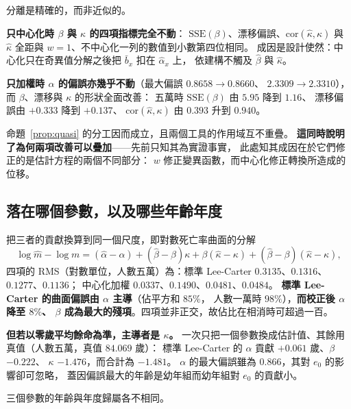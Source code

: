 \documentclass[UTF8, fontset=macnew, a4paper, 12pt]{ctexart}
\begin{document}
分離是精確的，而非近似的。

\textbf{只中心化時 $\beta$ 與 $\kappa$ 的四項指標完全不動}：
$\mathrm{SSE}(\beta)$、漂移偏誤、$\mathrm{cor}(\hat\kappa,\kappa)$ 與
$\hat\kappa$ 全距與 $w=1$、不中心化一列的數值到小數第四位相同。
成因是設計使然：中心化只在奇異值分解之後把 $\bar b_x$ 扣在 $\hat\alpha_x$ 上，
依建構不觸及 $\hat\beta$ 與 $\hat\kappa$。

\textbf{只加權時 $\alpha$ 的偏誤亦幾乎不動}（最大偏誤 $0.8658\to0.8660$、
$2.3309\to2.3310$），而 $\beta$、漂移與 $\kappa$ 的形狀全面改善：
五萬時 $\mathrm{SSE}(\beta)$ 由 $5.95$ 降到 $1.16$、
漂移偏誤由 $+0.333$ 降到 $+0.137$、
$\mathrm{cor}(\hat\kappa,\kappa)$ 由 $0.393$ 升到 $0.940$。

命題~\ref{prop:quasi} 的分工因而成立，且兩個工具的作用域互不重疊。
\textbf{這同時說明了為何兩項改善可以疊加}——先前只知其為實證事實，
此處知其成因在於它們修正的是估計方程的兩個不同部分：
$w$ 修正變異函數，而中心化修正轉換所造成的位移。

\subsection{落在哪個參數，以及哪些年齡年度}\label{subsec:where}

把三者的貢獻換算到同一個尺度，即對數死亡率曲面的分解
$$\log\hat m-\log m=(\hat\alpha-\alpha)+(\hat\beta-\beta)\kappa
+\beta(\hat\kappa-\kappa)+(\hat\beta-\beta)(\hat\kappa-\kappa),$$
四項的 RMS（對數單位，人數五萬）為：標準 Lee-Carter
$0.3135$、$0.1316$、$0.1277$、$0.1136$；
中心化加權 $0.0337$、$0.1490$、$0.0481$、$0.0484$。
\textbf{標準 Lee-Carter 的曲面偏誤由 $\alpha$ 主導}（佔平方和 $85\%$，
人數一萬時 $98\%$），\textbf{而校正後 $\alpha$ 降至 $8\%$、
$\beta$ 成為最大的殘項}。四項並非正交，故佔比在相消時可超過一百。

\textbf{但若以零歲平均餘命為準，主導者是 $\kappa$。}
一次只把一個參數換成估計值、其餘用真值（人數五萬，真值 $84.069$ 歲）：
標準 Lee-Carter 的 $\alpha$ 貢獻 $+0.061$ 歲、$\beta$ $-0.222$、
$\kappa$ $\mathbf{-1.476}$，而合計為 $-1.481$。
$\alpha$ 的最大偏誤雖為 $0.866$，其對 $e_0$ 的影響卻可忽略，
蓋因偏誤最大的年齡是幼年組而幼年組對 $e_0$ 的貢獻小。

三個參數的年齡與年度歸屬各不相同。
\end{document}
